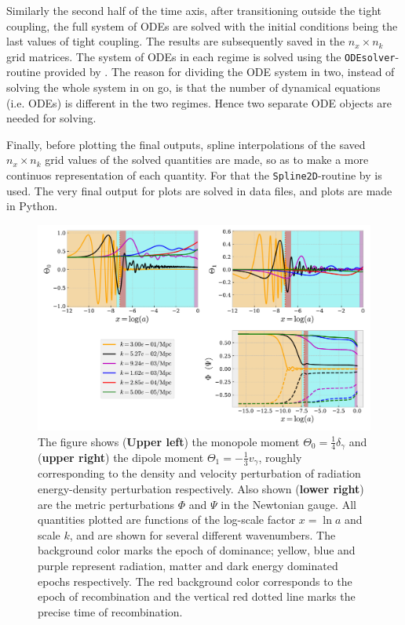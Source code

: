 \documentclass[twocolumn]{aastex62}
\begin{document}
Similarly the second half of the time axis, after transitioning outside the tight coupling, the full system of ODEs are solved with the initial conditions being the last values of tight coupling. The results are subsequently saved in the $n_x\times n_k$ grid matrices. The system of ODEs in each regime is solved using the \texttt{ODEsolver}-routine provided by \cite{winther:2020b}. The reason for dividing the ODE system in two, instead of solving the whole system in on go, is that the number of dynamical equations (i.e. ODEs) is different in the two regimes. Hence two separate ODE objects are needed for solving. 

Finally, before plotting the final outputs, spline interpolations of the saved $n_x\times n_k$ grid values of the solved quantities are made, so as to make a more continuos representation of each quantity. For that the \texttt{Spline2D}-routine by \cite{winther:2020b} is used. The very final output for plots are solved in data files, and plots are made in Python.



\begin{figure}
    \includegraphics[scale = 0.65]{Figures/fig1.pdf}
    \caption{The figure shows (\textbf{Upper left}) the monopole moment $\Theta_0 = \frac{1}{4}\delta_\gamma$ and (\textbf{upper right}) the dipole moment $\Theta_1 = -\frac{1}{3}v_\gamma$, roughly corresponding to the density and velocity perturbation of radiation energy-density perturbation respectively. Also shown (\textbf{lower right}) are the metric perturbations $\Phi$ and $\Psi$ in the Newtonian gauge. All quantities plotted are functions of the log-scale factor $x = \ln a$ and scale $k$, and are shown for several different wavenumbers. The background color marks the epoch of dominance; yellow, blue and purple represent radiation, matter and dark energy dominated epochs respectively. The red background color corresponds to the epoch of recombination and the vertical red dotted line marks the precise time of recombination.} 
    \label{fig:fig1}
\end{figure}
\end{document}

